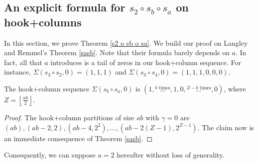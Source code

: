 \documentclass[twoside]{article}
\begin{document}
\subsection{An explicit formula for \texorpdfstring{$s_2\circ s_b\circ s_a$}{s2 o sb o sa} on hook+columns}\label{sec:s2sasb}

In this section, we prove Theorem \ref{s2 o sb o sa}. 
We build our proof on Langley and Remmel's Theorem  \ref{sasb}.
Note that their formula barely depends on $a$. In fact, all that $a$ introduces is a tail of zeros in our hook+column sequence. For instance, $\Sigma(s_3 \circ s_2, 0) = (1, 1, 1)$ and $\Sigma(s_3 \circ s_4,0) = (1, 1, 1, 0, 0, 0)$.
\begin{lem}\label{tail0}
The hook+column sequence $\Sigma(s_b\circ s_a,0)$ is $(1,\stackrel{b\text{ times}}{\ldots},1,0,\stackrel{Z-b\text{ times}}{\ldots},0)$, where $Z = \left\lfloor\frac{ab}{2}\right\rfloor$.
\end{lem}
\begin{proof}
    The hook+column partitions of size $ab$ with $\gamma=0$ are $(ab), (ab-2, 2), (ab-4, 2^2), \ldots, (ab-2(Z-1), 2^{Z-1})$. The claim now is an immediate consequence of Theorem \ref{sasb}.
\end{proof}
Consequently, we can suppose $a=2$ hereafter without loss of generality.
\end{document}
